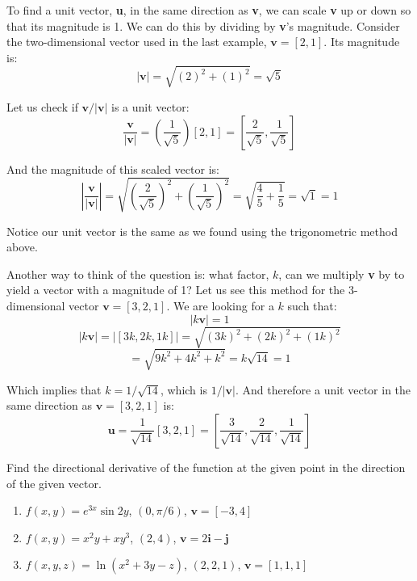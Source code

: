 To find a unit vector, \textbf{u}, in the same direction as \textbf{v}, we can 
scale \textbf{v} up or down so that its magnitude is 1. We can do this by 
dividing by \textbf{v}'s magnitude. Consider the two-dimensional vector used 
in the last example, $\textbf{v} = \left[ 2, 1 \right]$. Its magnitude is:
$$| \textbf{v} | = \sqrt{\left( 2 \right)^2 + \left( 1 \right)^2} = \sqrt{5}$$

Let us check if $\textbf{v} / | \textbf{v} |$ is a unit vector:
$$ \frac{\textbf{v}}{|\textbf{v}|} = \left( \frac{1}{\sqrt{5}} \right) \left[ 
2, 1 \right] = \left[ \frac{2}{\sqrt{5}}, \frac{1}{\sqrt{5}} \right]$$

And the magnitude of this scaled vector is:
$$ \left| \frac{\textbf{v}}{| \textbf{v} |} \right| = \sqrt{\left( \frac{2}{
\sqrt{5}} \right)^2 + \left( \frac{1}{\sqrt{5}} \right)^2} = \sqrt{\frac{4}{5} 
+ \frac{1}{5}} = \sqrt{1} = 1$$

Notice our unit vector is the same as we found using the trigonometric method 
above. 

Another way to think of the question is: what factor, $k$, can we multiply 
\textbf{v} by to yield a vector with a magnitude of 1? Let us see this method 
for the 3-dimensional vector $\textbf{v} = \left[ 3, 2, 1 \right]$. We are 
looking for a $k$ such that:
$$|k\textbf{v}| = 1$$
$$|k \textbf{v}| = \left| \left[ 3k, 2k, 1k \right] \right| = \sqrt{\left( 3k 
\right)^2 + \left( 2k \right)^2 + \left( 1k \right)^2}$$
$$= \sqrt{9k^2 + 4k^2 + k^2} = k\sqrt{14} = 1$$

Which implies that $k = 1/\sqrt{14}$, which is $1/|\textbf{v}|$. And therefore 
a unit vector in the same direction as $\textbf{v} = \left[ 3, 2, 1 \right]$ 
is:
$$\textbf{u} = \frac{1}{\sqrt{14}} \left[ 3, 2, 1 \right] = \left[ \frac{3}{
\sqrt{14}}, \frac{2}{\sqrt{14}}, \frac{1}{\sqrt{14}} \right]$$


\begin{Exercise}[title = {Finding Directional Derivatives}, label = direction]
Find the directional derivative of the function at the given point in the 
direction of the given vector. 
\begin{enumerate}
    \item $f(x, y) = e^{3x} \sin{2y}$, $(0, \pi/6)$, $\textbf{v} = \left[ -3, 
    4 \right]$
    \item $f(x, y) = x^2y + xy^3$, $(2, 4)$, $\textbf{v} = 2 \textbf{i} - 
    \textbf{j}$
    \item $f(x, y, z) = \ln{ \left( x^2 + 3y - z \right)}$, $(2, 2, 1)$, 
    $\textbf{v} = \left[ 1, 1, 1 \right]$
\end{enumerate}
\end{Exercise}

